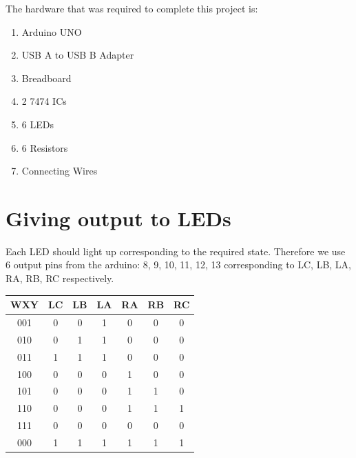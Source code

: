 \documentclass[12pt, letterpaper]{report}
\begin{document}
The hardware that was required to complete this project is:



\begin{enumerate}
  \item Arduino UNO
  \item USB A to USB B Adapter
  \item Breadboard
  \item 2 7474 ICs
  \item 6 LEDs
  \item 6 Resistors
  \item Connecting Wires
  
\end{enumerate}



\section{Giving output to LEDs}

Each LED should light up corresponding to the required state. Therefore we use 6 output pins from the arduino: 8, 9, 10, 11, 12, 13 corresponding to LC, LB, LA, RA, RB, RC respectively. 

\begin{center}
 \begin{tabular}{||c c c c c c c||} 
 \hline
  WXY & LC & LB & LA & RA & RB & RC \\ [0.5ex] 
 \hline
 
 \hline\hline
 001 & 0 & 0 & 1 & 0 & 0 & 0 \\ 
 \hline
 010 & 0 & 1 & 1 & 0 & 0 & 0 \\ 
 \hline
 011 & 1 & 1 & 1 & 0 & 0 & 0 \\ 
 \hline
 100 & 0 & 0 & 0 & 1 & 0 & 0 \\ 
 \hline
 101 & 0 & 0 & 0 & 1 & 1 & 0 \\  
 \hline
 110 & 0 & 0 & 0 & 1 & 1 & 1 \\ 
 \hline
 111 & 0 & 0 & 0 & 0 & 0 & 0 \\  
 \hline
 000 & 1 & 1 & 1 & 1 & 1 & 1 \\ 
 \hline
 \hline
 
\end{tabular}
\end{center}
\end{document}
